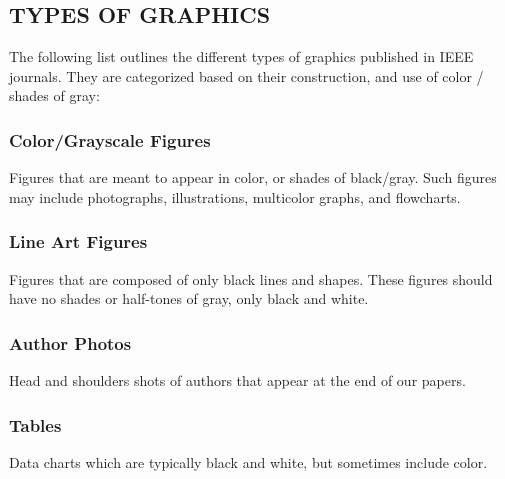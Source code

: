 \documentclass{IEEEoj}
\begin{document}
\subsection{TYPES OF GRAPHICS}
The following list outlines the different types of graphics published in 
IEEE journals. They are categorized based on their construction, and use of 
color / shades of gray:

\subsubsection{Color/Grayscale Figures}
Figures that are meant to appear in color, or shades of black/gray. Such 
figures may include photographs, illustrations, multicolor graphs, and 
flowcharts.

\subsubsection{Line Art Figures}
Figures that are composed of only black lines and shapes. These figures 
should have no shades or half-tones of gray, only black and white.

\subsubsection{Author Photos}
Head and shoulders shots of authors that appear at the end of our papers. 

\subsubsection{Tables}
Data charts which are typically black and white, but sometimes include 
color.
\end{document}
